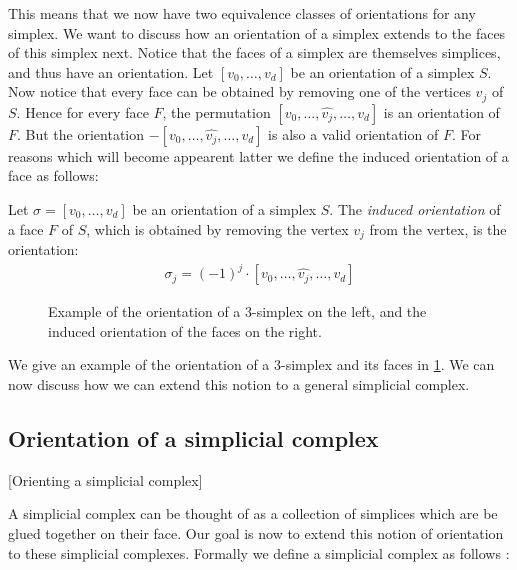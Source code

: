This means that we now have two equivalence classes of orientations for any simplex. We want to discuss how an orientation of a simplex extends to the faces of this simplex next. Notice that the faces of a simplex are themselves simplices, and thus have an orientation. Let $[v_0, \dots, v_{d}]$ be an orientation of a simplex $S$. Now notice that every face can be obtained by removing one of the vertices $v_j$ of $S$. Hence for every face $F$, the permutation $[v_0, \dots, \hat{v_j}, \dots, v_{d}]$ is an orientation of $F$. But the orientation $- [v_0, \dots, \hat{v_j}, \dots, v_{d}]$ is also a valid orientation of $F$. For reasons which will become appearent latter we define the induced orientation of a face as follows:

\begin{definition}
    Let $\sigma = [v_0, \dots, v_{d}]$ be an orientation of a simplex $S$. The \emph{induced orientation} of a face $F$ of $S$, which is obtained by removing the vertex $v_j$ from the vertex, is the orientation:
    \begin{align*}
        \sigma_j = (-1)^j \cdot [v_0, \dots, \hat{v_j}, \dots, v_{d}]
    \end{align*}
\end{definition}

\begin{figure}[ht]
    \centering
    \caption[Orientation of a simplex]{Example of the orientation of a 3-simplex on the left, and the induced orientation of the faces on the right.}
    \label{fig:orientation_of_simplex}
\end{figure}

We give an example of the orientation of a 3-simplex and its faces in \cref{fig:orientation_of_simplex}. We can now discuss how we can extend this notion to a general simplicial complex.

\subsection{Orientation of a simplicial complex}[Orienting a simplicial complex]

A simplicial complex can be thought of as a collection of simplices which are be glued together on their face. Our goal is now to extend this notion of orientation to these simplicial complexes. Formally we define a simplicial complex as follows :

